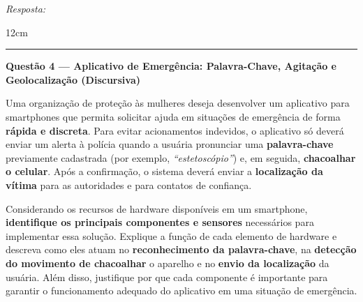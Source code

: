\documentclass[12pt]{article}
\begin{document}

\vspace{0.4cm}

\noindent\textit{Resposta:}

\begin{resposta}{12cm}
\end{resposta}


\vspace{0.8cm}
\noindent\rule{\textwidth}{0.8pt}
\vspace{0.3cm}

\noindent\textbf{Questão 4 — Aplicativo de Emergência: Palavra-Chave, Agitação e Geolocalização (Discursiva)}

\vspace{0.3cm}
\noindent
Uma organização de proteção às mulheres deseja desenvolver um aplicativo para smartphones
que permita solicitar ajuda em situações de emergência de forma \textbf{rápida e discreta}.
Para evitar acionamentos indevidos, o aplicativo só deverá enviar um alerta à polícia quando
a usuária pronunciar uma \textbf{palavra-chave} previamente cadastrada (por exemplo,
\textit{``estetoscópio''}) e, em seguida, \textbf{chacoalhar o celular}. Após a confirmação,
o sistema deverá enviar a \textbf{localização da vítima} para as autoridades e para contatos
de confiança.

\vspace{0.3cm}
\noindent
Considerando os recursos de hardware disponíveis em um smartphone,
\textbf{identifique os principais componentes e sensores} necessários para implementar essa
solução. Explique a função de cada elemento de hardware e descreva como eles atuam no
\textbf{reconhecimento da palavra-chave}, na \textbf{detecção do movimento de chacoalhar} o
aparelho e no \textbf{envio da localização} da usuária. Além disso, justifique por que cada
componente é importante para garantir o funcionamento adequado do aplicativo em uma situação
de emergência.

\vspace{0.5cm}
\end{document}
